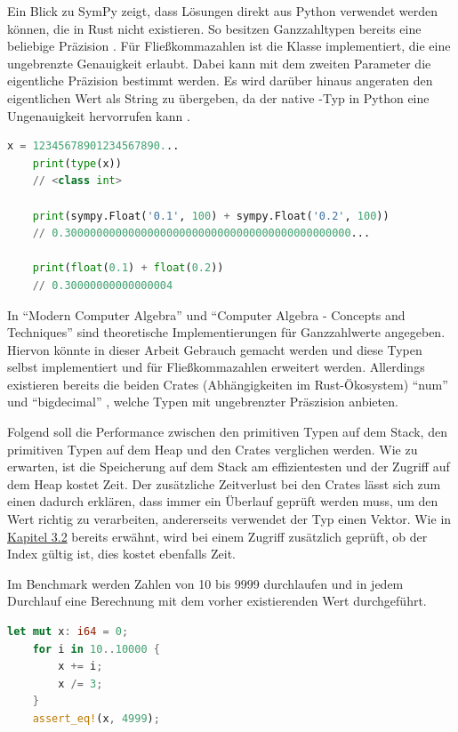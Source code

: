 \documentclass[11pt,a4paper, ngerman]{article}
\begin{document}
Ein Blick zu SymPy zeigt, dass Lösungen direkt aus Python verwendet werden können, die in Rust nicht existieren. So besitzen Ganzzahltypen bereits eine beliebige Präzision \cite{PythonDocuIntPrecision}. Für Fließkommazahlen ist die Klasse  implementiert, die eine ungebrenzte Genauigkeit erlaubt. Dabei kann mit dem zweiten Parameter die eigentliche Präzision bestimmt werden. Es wird darüber hinaus angeraten den eigentlichen Wert als String zu übergeben, da der native -Typ in Python eine Ungenauigkeit hervorrufen kann \cite{SymPyFloat}.

\begin{lstlisting}[language=Python, caption={SymPy Präzision}]
    x = 12345678901234567890...
    print(type(x))
    // <class int>

    print(sympy.Float('0.1', 100) + sympy.Float('0.2', 100))
    // 0.300000000000000000000000000000000000000000000...

    print(float(0.1) + float(0.2))
    // 0.30000000000000004
\end{lstlisting}

In ``Modern Computer Algebra'' \cite[S. 29 ff.]{Gathen2013} und ``Computer Algebra - Concepts and Techniques'' \cite[S. 81 ff.]{Lamagna2019} sind theoretische Implementierungen für Ganzzahlwerte angegeben. Hiervon könnte in dieser Arbeit Gebrauch gemacht werden und diese Typen selbst implementiert und für Fließkommazahlen erweitert werden. Allerdings existieren bereits die beiden Crates (Abhängigkeiten im Rust-Ökosystem) ``num'' \cite{CrateNum} und ``bigdecimal'' \cite{CrateBigdecimal}, welche Typen mit ungebrenzter Präszision anbieten.

Folgend soll die Performance zwischen den primitiven Typen auf dem Stack, den primitiven Typen auf dem Heap und den Crates verglichen werden. Wie zu erwarten, ist die Speicherung auf dem Stack am effizientesten und der Zugriff auf dem Heap kostet Zeit. Der zusätzliche Zeitverlust bei den Crates lässt sich zum einen dadurch erklären, dass immer ein Überlauf geprüft werden muss, um den Wert richtig zu verarbeiten, andererseits verwendet der Typ  einen Vektor. Wie in \hyperref[sec:kap3d2]{Kapitel 3.2} bereits erwähnt, wird bei einem Zugriff zusätzlich geprüft, ob der Index gültig ist, dies kostet ebenfalls Zeit.

Im Benchmark werden Zahlen von 10 bis 9999 durchlaufen und in jedem Durchlauf eine Berechnung mit dem vorher existierenden Wert durchgeführt.

\begin{lstlisting}[language=rust, caption={Benchmark Primitive Typen Stack Ganzzahl}]
    let mut x: i64 = 0;
    for i in 10..10000 {
        x += i;
        x /= 3;
    }
    assert_eq!(x, 4999);
\end{lstlisting}
\end{document}
